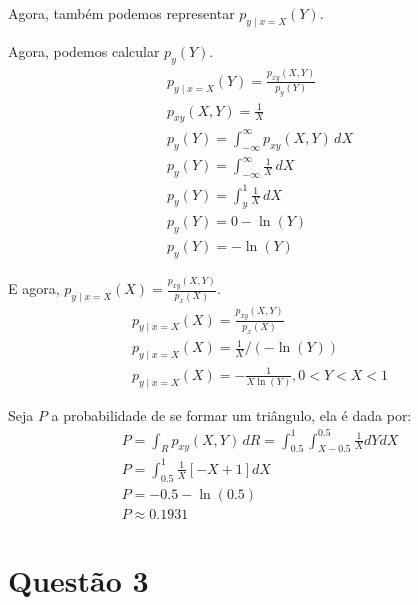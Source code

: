 \documentclass[a5paper]{report}
\begin{document}
Agora, também podemos representar $p_{y \mid x = X}(Y)$.
\begin{center}
\end{center}

Agora, podemos calcular $p_y(Y)$.
\begin{align*}
    p_{y \mid x = X}(Y) = \frac{p_{xy}(X, Y)}{p_y(Y)}\\
    p_{xy}(X, Y) = \frac{1}{X}\\
    p_y(Y) = \int_{-\infty}^{\infty} p_{xy}(X, Y) \, dX\\
    p_y(Y) = \int_{-\infty}^{\infty} \frac{1}{X} \, dX\\
    p_y(Y) = \int_{y}^{1} \frac{1}{X} \, dX\\
    p_y(Y) = 0 - \ln (Y)\\
    p_y(Y) = -\ln(Y)
\end{align*}

E agora, $p_{y \mid x = X}(X) = \frac{p_{xy}(X, Y)}{p_x(X)}$.
\begin{align*}
    p_{y \mid x = X}(X) = \frac{p_{xy}(X, Y)}{p_x(X)}\\
    p_{y \mid x = X}(X) = \frac{1}{X}/(-\ln(Y))\\
    p_{y \mid x = X}(X) = -\frac{1}{X\ln(Y)}, 0 < Y < X < 1
\end{align*}

Seja $P$ a probabilidade de se formar um triângulo, ela é dada por:
\begin{align*}
    P = \int_R p_{xy}(X, Y) \, dR = \int_{0.5}^{1} \int_{X - 0.5}^{0.5} \frac{1}{X} dYdX\\
    P = \int_{0.5}^{1} \frac{1}{X}[-X + 1] dX\\
    P = -0.5 - \ln(0.5)\\
    P \approx 0.1931
\end{align*}


\section*{Questão 3}
\end{document}
